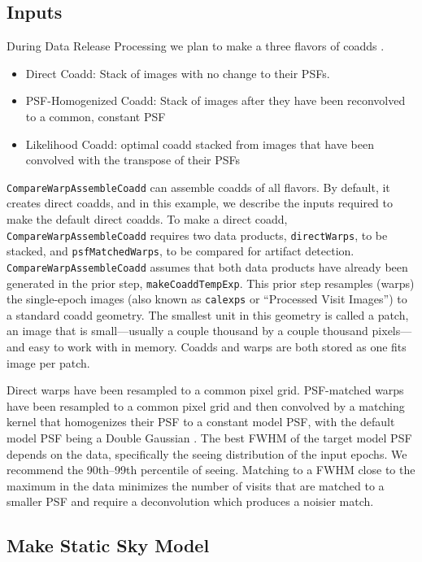 \documentclass[DM,authoryear,toc]{lsstdoc}
\begin{document}
\subsection{Inputs}
\label{sec:inputs}

During Data Release Processing we plan to make a three flavors of coadds \citep{dmtn15}.
\begin{itemize}
\item Direct Coadd: Stack of images with no change to their PSFs.
\item  PSF-Homogenized Coadd: Stack of images after they have been reconvolved to a common, constant PSF
\item  Likelihood Coadd: optimal coadd stacked from images that have been convolved with the transpose of their PSFs
\end{itemize}

 \texttt{CompareWarpAssembleCoadd} can assemble coadds of all flavors.
 By default, it creates direct coadds, and in this example, we describe the inputs required to make the default direct coadds.
To make a direct coadd, \texttt{CompareWarpAssembleCoadd} requires two data products, \texttt{directWarps}, to be stacked, and \texttt{psfMatchedWarps}, to be compared for artifact detection.
\texttt{CompareWarpAssembleCoadd}  assumes that both data products have already been generated in the prior step, \texttt{makeCoaddTempExp}.
This prior step resamples (warps) the single-epoch images (also known as \texttt{calexps} or ``Processed Visit Images'') to a standard coadd geometry.
The smallest unit in this geometry is called a patch, an image that is small---usually a couple thousand by a couple thousand pixels---and easy to work with in memory.
Coadds and warps are both stored as one fits image per patch.

Direct warps have been resampled to a common pixel grid.
PSF-matched warps have been resampled to a common pixel grid and then convolved by a matching kernel that homogenizes their PSF to a constant model PSF, with the default model PSF being a Double Gaussian \citep{ldm151}.
The best FWHM of the target model PSF depends on the data, specifically the seeing distribution of the input epochs.
We recommend the 90th--99th percentile of seeing.
Matching to a FWHM close to the maximum in the data minimizes the number of visits that are matched to a smaller PSF  and require a deconvolution which produces a noisier match.

\subsection{Make Static Sky Model}
\end{document}
